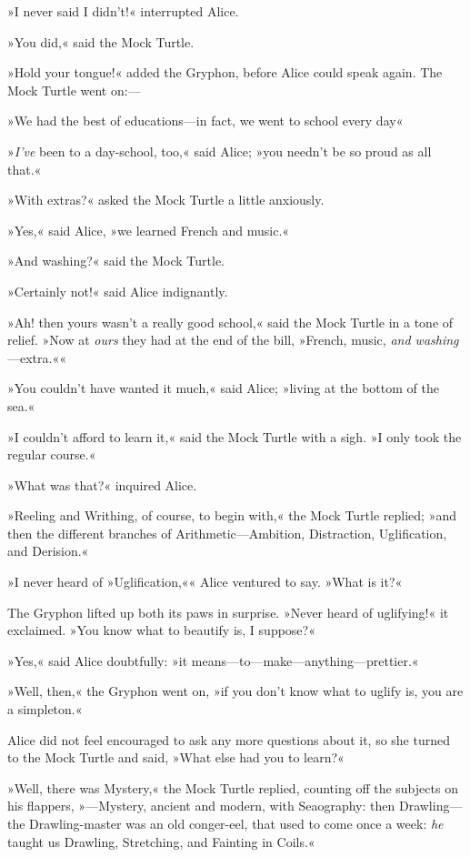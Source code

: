 »I never said I didn't!« interrupted Alice.

»You did,« said the Mock Turtle.

»Hold your tongue!« added the Gryphon, before Alice could speak again. The Mock Turtle went on:—

»We had the best of educations—in fact, we went to school every day\longdash«

»\textit{I've} been to a day-school, too,« said Alice; »you needn't be so proud as all that.«

»With extras?« asked the Mock Turtle a little anxiously.

»Yes,« said Alice, »we learned French and music.«

»And washing?« said the Mock Turtle.

»Certainly not!« said Alice indignantly.

»Ah! then yours wasn't a really good school,« said the Mock Turtle in a tone of relief. »Now at \textit{ours} they had at the end of the bill, »French, music, \textit{and washing}—extra.««

»You couldn't have wanted it much,« said Alice; »living at the bottom of the sea.«

»I couldn't afford to learn it,« said the Mock Turtle with a sigh. »I only took the regular course.«

»What was that?« inquired Alice.

»Reeling and Writhing, of course, to begin with,« the Mock Turtle replied; »and then the different branches of Arithmetic—Ambition, Distraction, Uglification, and Derision.«

»I never heard of »Uglification,«« Alice ventured to say. »What is it?«

The Gryphon lifted up both its paws in surprise. »Never heard of uglifying!« it exclaimed. »You know what to beautify is, I suppose?«

»Yes,« said Alice doubtfully: »it means—to—make—anything—prettier.«

»Well, then,« the Gryphon went on, »if you don't know what to uglify is, you are a simpleton.«

Alice did not feel encouraged to ask any more questions about it, so she turned to the Mock Turtle and said, »What else had you to learn?«

»Well, there was Mystery,« the Mock Turtle replied, counting off the subjects on his flappers, »—Mystery, ancient and modern, with Seaography: then Drawling—the Drawling-master was an old conger-eel, that used to come once a week: \textit{he} taught us Drawling, Stretching, and Fainting in Coils.«

